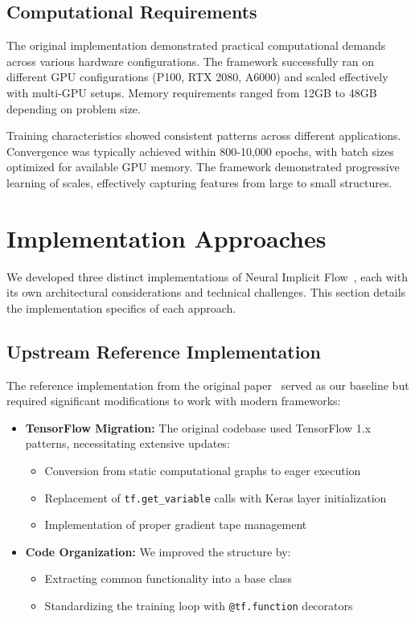 \documentclass[10pt,journal,compsoc,onecolumn]{IEEEtran}
\begin{document}
\subsection{Computational Requirements}
The original implementation demonstrated practical computational demands across various hardware configurations. The framework successfully ran on different GPU configurations (P100, RTX 2080, A6000) and scaled effectively with multi-GPU setups. Memory requirements ranged from 12GB to 48GB depending on problem size.

Training characteristics showed consistent patterns across different applications. Convergence was typically achieved within 800-10,000 epochs, with batch sizes optimized for available GPU memory. The framework demonstrated progressive learning of scales, effectively capturing features from large to small structures.

\section{Implementation Approaches}\label{sec:implementation}
We developed three distinct implementations of Neural Implicit Flow~\cite{nif2023}, each with its own architectural considerations and technical challenges. This section details the implementation specifics of each approach.

\subsection{Upstream Reference Implementation}
The reference implementation from the original paper~\cite{nif2023} served as our baseline but required significant modifications to work with modern frameworks:

\begin{itemize}
    \item \textbf{TensorFlow Migration:} The original codebase used TensorFlow 1.x patterns, necessitating extensive updates:
    \begin{itemize}
        \item Conversion from static computational graphs to eager execution
        \item Replacement of \texttt{tf.get\_variable} calls with Keras layer initialization
        \item Implementation of proper gradient tape management
    \end{itemize}
    
    \item \textbf{Code Organization:} We improved the structure by:
    \begin{itemize}
        \item Extracting common functionality into a base class
        \item Standardizing the training loop with \texttt{@tf.function} decorators
    \end{itemize}
\end{itemize}
\end{document}
